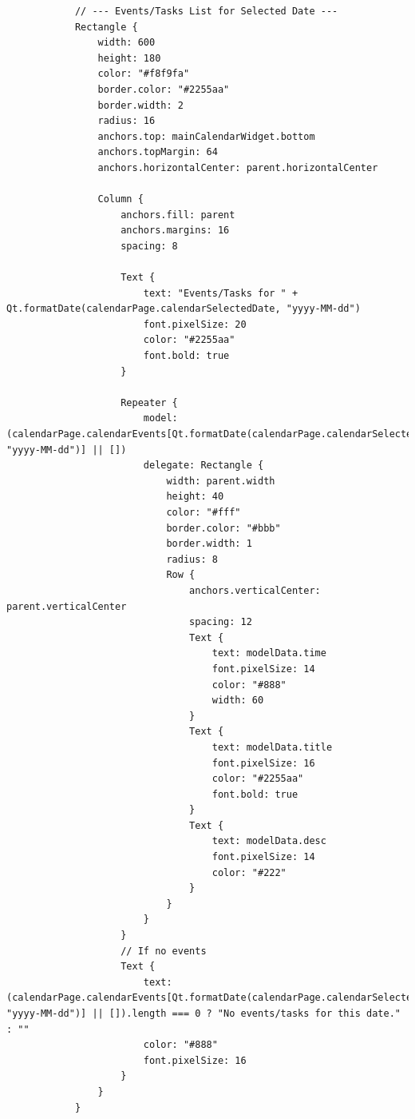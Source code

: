 \documentclass{report}
\begin{document}
\begin{lstlisting}
            // --- Events/Tasks List for Selected Date ---
            Rectangle {
                width: 600
                height: 180
                color: "#f8f9fa"
                border.color: "#2255aa"
                border.width: 2
                radius: 16
                anchors.top: mainCalendarWidget.bottom
                anchors.topMargin: 64
                anchors.horizontalCenter: parent.horizontalCenter

                Column {
                    anchors.fill: parent
                    anchors.margins: 16
                    spacing: 8

                    Text {
                        text: "Events/Tasks for " + Qt.formatDate(calendarPage.calendarSelectedDate, "yyyy-MM-dd")
                        font.pixelSize: 20
                        color: "#2255aa"
                        font.bold: true
                    }

                    Repeater {
                        model: (calendarPage.calendarEvents[Qt.formatDate(calendarPage.calendarSelectedDate, "yyyy-MM-dd")] || [])
                        delegate: Rectangle {
                            width: parent.width
                            height: 40
                            color: "#fff"
                            border.color: "#bbb"
                            border.width: 1
                            radius: 8
                            Row {
                                anchors.verticalCenter: parent.verticalCenter
                                spacing: 12
                                Text {
                                    text: modelData.time
                                    font.pixelSize: 14
                                    color: "#888"
                                    width: 60
                                }
                                Text {
                                    text: modelData.title
                                    font.pixelSize: 16
                                    color: "#2255aa"
                                    font.bold: true
                                }
                                Text {
                                    text: modelData.desc
                                    font.pixelSize: 14
                                    color: "#222"
                                }
                            }
                        }
                    }
                    // If no events
                    Text {
                        text: (calendarPage.calendarEvents[Qt.formatDate(calendarPage.calendarSelectedDate, "yyyy-MM-dd")] || []).length === 0 ? "No events/tasks for this date." : ""
                        color: "#888"
                        font.pixelSize: 16
                    }
                }
            }


\end{lstlisting}
\end{document}
